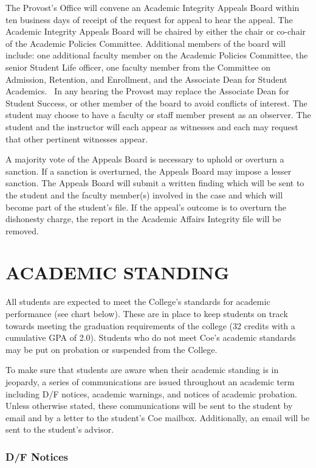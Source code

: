 \documentclass[
  letterpaper,
]{scrbook}
\begin{document}
The Provost's Office will convene an Academic Integrity Appeals Board
within ten business days of receipt of the request for appeal to hear
the appeal. The Academic Integrity Appeals Board will be chaired by
either the chair or co-chair of the Academic Policies Committee.
Additional members of the board will include: one additional faculty
member on the Academic Policies Committee, the senior Student Life
officer, one faculty member from the Committee on Admission, Retention,
and Enrollment, and the Associate Dean for Student Academics. ~In any
hearing the Provost may replace the Associate Dean for Student Success,
or other member of the board to avoid conflicts of interest. The student
may choose to have a faculty or staff member present as an observer. The
student and the instructor will each appear as witnesses and each may
request that other pertinent witnesses appear.

A majority vote of the Appeals Board is necessary to uphold or overturn
a sanction. If a sanction is overturned, the Appeals Board may impose a
lesser sanction. The Appeals Board will submit a written finding which
will be sent to the student and the faculty member(s) involved in the
case and which will become part of the student's file. If the appeal's
outcome is to overturn the dishonesty charge, the report in the Academic
Affairs Integrity file will be removed.

\chapter{ACADEMIC STANDING}\label{academic-standing}

All students are expected to meet the College's standards for academic
performance (see chart below). These are in place to keep students on
track towards meeting the graduation requirements of the college (32
credits with a cumulative GPA of 2.0). Students who do not meet Coe's
academic standards may be put on probation or suspended from the
College.

To make sure that students are aware when their academic standing is in
jeopardy, a series of communications are issued throughout an academic
term including D/F notices, academic warnings, and notices of academic
probation. Unless otherwise stated, these communications will be sent to
the student by email and by a letter to the student's Coe mailbox.
Additionally, an email will be sent to the student's advisor.

\subsection{D/F Notices}\label{df-notices}
\end{document}

